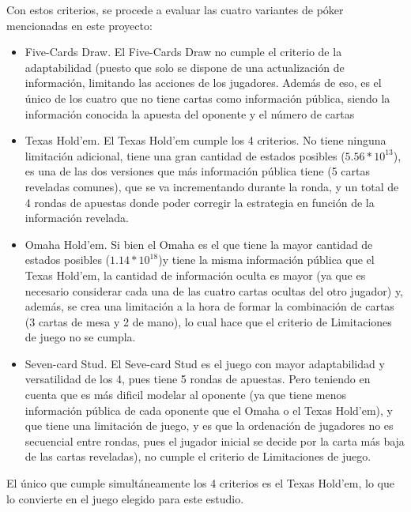 Con estos criterios, se procede a evaluar las cuatro variantes de póker mencionadas en este proyecto:
\begin{itemize}
\item Five-Cards Draw. El Five-Cards Draw no cumple  el criterio de la adaptabilidad (puesto que solo se dispone de una actualización de información, limitando las acciones de los jugadores. Además de eso, es el único de los cuatro que no tiene cartas como información pública, siendo la información conocida la apuesta del oponente y el número de cartas
\item Texas Hold'em. El Texas Hold'em cumple los 4 criterios. No tiene ninguna limitación adicional, tiene una gran cantidad de estados posibles ($5.56*10^{13}$)\footnotemark, es una de las dos versiones que más información pública tiene (5 cartas reveladas comunes), que se va incrementando durante la ronda, y un total de 4 rondas de apuestas donde poder corregir la estrategia en función de la información revelada.
\item Omaha Hold'em. Si bien el Omaha es el que tiene la mayor cantidad de estados posibles ($1.14 * 10^{18}$)\footnotemark[\value{footnote}] y tiene la misma información pública que el Texas Hold'em, la cantidad de información oculta es mayor (ya que es necesario considerar cada una de las cuatro cartas ocultas del otro jugador) y, además, se crea una limitación a la hora de formar la combinación de cartas (3 cartas de mesa y 2 de mano), lo cual hace que el criterio de Limitaciones de juego no se cumpla.
\item Seven-card Stud. El Seve-card Stud es el juego con mayor adaptabilidad y versatilidad de los 4, pues tiene 5 rondas de apuestas. Pero teniendo en cuenta que es más dificil modelar al oponente (ya que tiene menos información pública de cada oponente que el Omaha o el Texas Hold'em), y que tiene una limitación de juego, y es que la ordenación de jugadores no es secuencial entre rondas, pues el jugador inicial se decide por la carta más baja de las cartas reveladas), no cumple el criterio de Limitaciones de juego.
\end{itemize}

El único que cumple simultáneamente los 4 criterios es el Texas Hold'em, lo que lo convierte en el juego elegido para este estudio.


